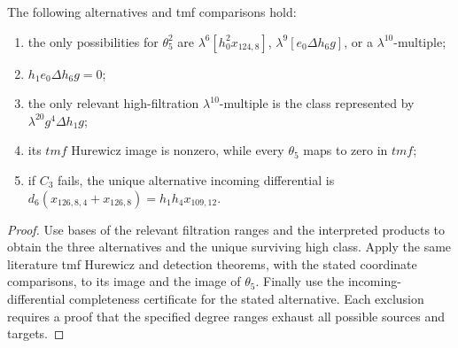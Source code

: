 \begin{proposition}
  \label{evidence:theta5-square-tmf}
  \notready
  The following alternatives and tmf comparisons hold:
  \begin{enumerate}
    \item the only possibilities for $\theta_5^2$ are
      $\lambda^6[h_0^2x_{124,8}]$,
      $\lambda^9[e_0\Delta h_6g]$, or a $\lambda^{10}$-multiple;
    \item $h_1e_0\Delta h_6g=0$;
    \item the only relevant high-filtration $\lambda^{10}$-multiple is the
      class represented by $\lambda^{20}g^4\Delta h_1g$;
    \item its $tmf$ Hurewicz image is nonzero, while every $\theta_5$ maps to
      zero in $tmf$;
    \item if $C_3$ fails, the unique alternative incoming differential is
      $d_6(x_{126,8,4}+x_{126,8})=h_1h_4x_{109,12}$.
  \end{enumerate}
\end{proposition}

\begin{proof}
  Use bases of the relevant filtration ranges and the interpreted products
  to obtain the three alternatives and the unique surviving high class. Apply the same literature
  tmf Hurewicz and detection theorems,
  with the stated coordinate comparisons, to its image and the image of
  $\theta_5$. Finally use the incoming-differential completeness certificate
  for the stated alternative. Each exclusion requires a proof that the
  specified degree ranges exhaust all possible sources and targets.
\end{proof}

